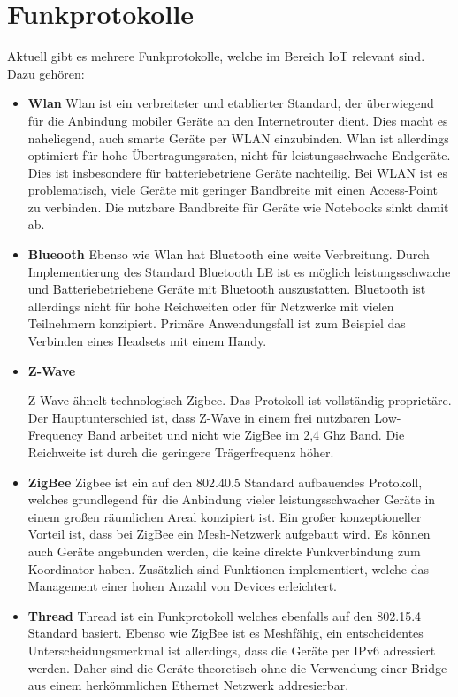 \section{Funkprotokolle}
Aktuell gibt es mehrere Funkprotokolle, welche im Bereich IoT relevant sind. Dazu gehören:
\begin{itemize}
    \item \textbf{Wlan}
    Wlan ist ein verbreiteter und etablierter Standard, der überwiegend für die Anbindung mobiler Geräte an den
    Internetrouter dient. Dies macht es naheliegend, auch smarte Geräte per WLAN einzubinden. Wlan ist allerdings 
    optimiert für hohe Übertragungsraten, nicht für leistungsschwache Endgeräte. Dies ist
    insbesondere für batteriebetriene Geräte nachteilig. Bei WLAN ist es problematisch, viele Geräte mit geringer Bandbreite mit einen Access-Point zu verbinden.
    Die nutzbare Bandbreite für Geräte wie Notebooks sinkt damit ab. 

    \item \textbf{Blueooth}
    Ebenso wie Wlan hat Bluetooth eine weite Verbreitung. Durch Implementierung 
    des Standard Bluetooth LE ist es möglich leistungsschwache und Batteriebetriebene Geräte mit Bluetooth auszustatten. Bluetooth
    ist allerdings nicht für hohe Reichweiten oder für Netzwerke mit vielen Teilnehmern konzipiert. Primäre Anwendungsfall ist zum Beispiel das Verbinden eines Headsets mit 
    einem Handy. 

    \item \textbf{Z-Wave}
    
    Z-Wave ähnelt technologisch Zigbee. Das Protokoll ist vollständig proprietäre. Der Hauptunterschied ist, dass Z-Wave in einem frei nutzbaren
    Low-Frequency Band arbeitet und nicht wie ZigBee im 2,4 Ghz Band. Die Reichweite ist durch die geringere Trägerfrequenz höher.

    \item \textbf{ZigBee}
    Zigbee ist ein auf den 802.40.5 Standard aufbauendes Protokoll, welches grundlegend für die Anbindung vieler leistungsschwacher
    Geräte in einem großen räumlichen Areal konzipiert ist. Ein großer konzeptioneller Vorteil ist, dass bei 
    ZigBee ein Mesh-Netzwerk aufgebaut wird. Es können auch Geräte angebunden werden, die keine direkte Funkverbindung
    zum Koordinator haben. Zusätzlich sind Funktionen implementiert, welche das Management einer hohen Anzahl von Devices
    erleichtert.
    
    \item \textbf{Thread}
    Thread ist ein Funkprotokoll welches ebenfalls auf den 802.15.4 Standard basiert. Ebenso wie ZigBee ist es Meshfähig, ein
    entscheidentes Unterscheidungsmerkmal ist allerdings, dass die Geräte per IPv6 adressiert werden. Daher sind die Geräte
    theoretisch ohne die Verwendung einer Bridge aus einem herkömmlichen Ethernet Netzwerk addresierbar.
\end{itemize}

